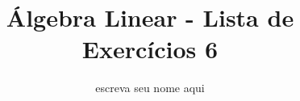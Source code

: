 \documentclass[leqno]{article}
\numberwithin{equation}{section}
\begin{document}
\newtheorem{teo}{Teorema}[section] \newtheorem*{teo*}{Teorema}
\newtheorem{prop}[teo]{Proposição} \newtheorem*{prop*}{Proposição}
\newtheorem{lema}[teo]{Lemma} \newtheorem*{lema*}{Lema}
\newtheorem{cor}[teo]{Corolário} \newtheorem*{cor*}{Corolário}

\theoremstyle{definition}
\newtheorem{defi}[teo]{Definição} \newtheorem*{defi*}{Definição}
\newtheorem{exem}[teo]{Exemplo} \newtheorem*{exem*}{Exemplo}
\newtheorem{obs}[teo]{Observação} \newtheorem*{obs*}{Observação}
\newtheorem*{hipo}{Hipóteses}
\newtheorem*{nota}{Notação}

\newcommand{\ds}{\displaystyle} \newcommand{\nl}{\newline}
\newcommand{\eps}{\varepsilon} \newcommand{\ssty}{\scriptstyle}
\newcommand{\bE}{\mathbb{E}}
\newcommand{\cB}{\mathcal{B}}
\newcommand{\cF}{\mathcal{F}}
\newcommand{\cA}{\mathcal{A}}
\newcommand{\cM}{\mathcal{M}}
\newcommand{\cD}{\mathcal{D}}
\newcommand{\cN}{\mathcal{N}}
\newcommand{\cL}{\mathcal{L}}
\newcommand{\cLN}{\mathcal{LN}}
\newcommand{\bP}{\mathbb{P}}
\newcommand{\bQ}{\mathbb{Q}}
\newcommand{\bN}{\mathbb{N}}
\newcommand{\bR}{\mathbb{R}}
\newcommand{\bZ}{\mathbb{Z}}

\newcommand{\bfw}{\mathbf{w}}
\newcommand{\bfv}{\mathbf{v}}
\newcommand{\bfu}{\mathbf{u}}
\newcommand{\bfx}{\mathbf{x}}
\newcommand{\bfb}{\mathbf{b}}

\newcommand{\bvecc}[2]{%
  \begin{bmatrix} #1 \\ #2  \end{bmatrix}
}
\newcommand{\bveccc}[3]{%
  \begin{bmatrix} #1 \\ #2 \\ #3  \end{bmatrix}
}

\newenvironment{sol}
{
    \vspace{4mm}
    \noindent\textbf{Resolução:}
    \strut\newline
    \smallskip
    \hspace{-3.5mm}
}
{}

\title{Álgebra Linear - Lista de Exercícios 6}

\author{escreva seu nome aqui}

\date{}

\maketitle
\end{document}
